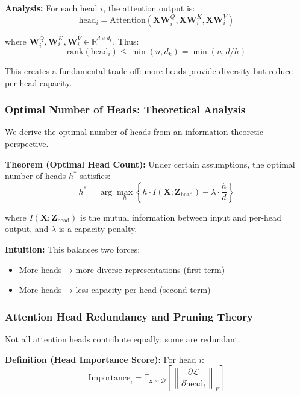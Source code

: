 \textbf{Analysis:} For each head $i$, the attention output is:
\begin{equation}
\text{head}_i = \text{Attention}(\mathbf{X}\mathbf{W}_i^Q, \mathbf{X}\mathbf{W}_i^K, \mathbf{X}\mathbf{W}_i^V)
\end{equation}

where $\mathbf{W}_i^Q, \mathbf{W}_i^K, \mathbf{W}_i^V \in \mathbb{R}^{d \times d_k}$. Thus:
\begin{equation}
\text{rank}(\text{head}_i) \leq \min(n, d_k) = \min(n, d/h)
\end{equation}

This creates a fundamental trade-off: more heads provide diversity but reduce per-head capacity.

\subsubsection{Optimal Number of Heads: Theoretical Analysis}

We derive the optimal number of heads from an information-theoretic perspective.

\textbf{Theorem (Optimal Head Count):} Under certain assumptions, the optimal number of heads $h^*$ satisfies:
\begin{equation}
h^* = \arg\max_h \left\{ h \cdot I(\mathbf{X}; \mathbf{Z}_{\text{head}}) - \lambda \cdot \frac{h}{d} \right\}
\end{equation}

where $I(\mathbf{X}; \mathbf{Z}_{\text{head}})$ is the mutual information between input and per-head output, and $\lambda$ is a capacity penalty.

\textbf{Intuition:} This balances two forces:
\begin{itemize}
    \item More heads → more diverse representations (first term)
    \item More heads → less capacity per head (second term)
\end{itemize}

\subsubsection{Attention Head Redundancy and Pruning Theory}

Not all attention heads contribute equally; some are redundant.

\textbf{Definition (Head Importance Score):} For head $i$:
\begin{equation}
\text{Importance}_i = \mathbb{E}_{\mathbf{x} \sim \mathcal{D}} \left[ \left\| \frac{\partial \mathcal{L}}{\partial \text{head}_i} \right\|_F \right]
\end{equation}

